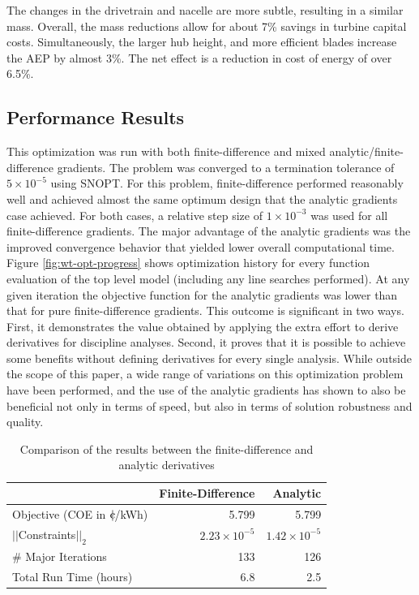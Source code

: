 \documentclass[]{aiaa-tc} %
\newcommand{\cent}{{\mathrm{c}\mkern-6.5mu{\mid}}}
\begin{document}
      The changes in the drivetrain and nacelle are more subtle, resulting in a similar mass.  Overall, the mass reductions allow for about 7\% savings in turbine capital costs.  Simultaneously, the larger hub height, and more efficient blades increase the AEP by almost 3\%.  The net effect is a reduction in cost of energy of over 6.5\%.

    \subsection{Performance Results}
        This optimization was run with both finite-difference and mixed analytic/finite-difference gradients.  The problem was converged to a termination tolerance of $5\times10^{-5}$ using SNOPT.  For this problem, finite-difference performed reasonably well and achieved almost the same optimum design that the analytic gradients case achieved. For both cases, a relative step size of $1\times10^{-3}$ was used for all
        finite-difference gradients. The major advantage of the analytic gradients was the improved convergence
        behavior that yielded lower overall computational time.  Figure \ref{fig:wt-opt-progress} shows optimization
        history for every function evaluation of the top level model (including any line searches performed). At any given iteration the objective function for the analytic gradients was lower than that for pure finite-difference gradients. This outcome is significant in two ways. First, it demonstrates the value obtained by applying the extra effort to derive derivatives for discipline analyses. Second, it proves that it is possible to achieve some benefits without defining derivatives for every single analysis. While outside the scope of this paper, a wide range of variations on this optimization problem have been performed, and the use of the analytic gradients has shown to also be beneficial not only in terms of speed, but also in terms of solution robustness and quality.



        \begin{table}
            \centering
            \caption{Comparison of the results between the finite-difference and analytic derivatives}
            \begin{tabular}{lrr}
                \toprule
                                                      & Finite-Difference & Analytic \\
                \midrule
                Objective (COE  in $\cent$/kWh)       & 5.799  & 5.799 \\ 
                $||$Constraints$||_2$                 & $2.23\times10^{-5}$ & $1.42\times10^{-5}$  \\ 
                \# Major Iterations                   &  133 & 126  \\
                Total Run Time (hours)                &  6.8 & 2.5 \\
                \bottomrule
            \end{tabular}
            \label{tab:wt-fd-speeds}
        \end{table}
\end{document}
